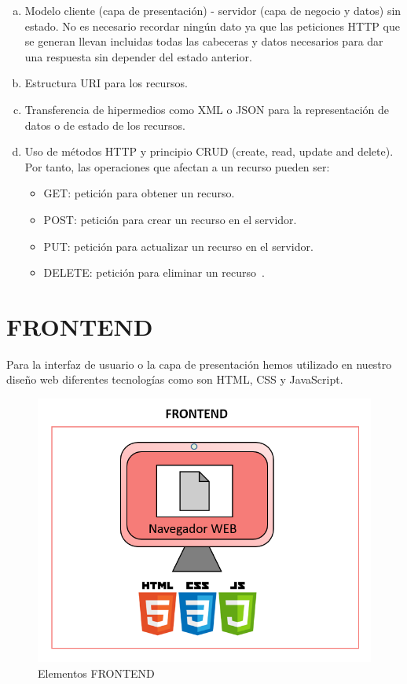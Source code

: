 \documentclass[a4paper, 12pt]{book}
\begin{document}
\begin{enumerate}[a)] %
\item Modelo cliente (capa de presentación) - servidor (capa de negocio y datos) sin estado. No es necesario recordar ningún dato ya que las peticiones HTTP que se generan llevan incluidas todas las cabeceras y datos necesarios para dar una respuesta sin depender del estado anterior.
\item Estructura URI para los recursos.
\item Transferencia de hipermedios como XML o JSON para la representación de datos o de estado de los recursos.
\item Uso de métodos HTTP y principio CRUD (create, read, update and delete). Por tanto, las operaciones que afectan a un recurso pueden ser:
\begin{itemize}
    \item GET: petición para obtener un recurso.
    \item POST: petición para crear un recurso en el servidor.
    \item PUT: petición para actualizar un recurso en el servidor.
    \item DELETE: petición para eliminar un recurso~\cite{rodriguez2008restful}.
\end{itemize}
\end{enumerate}
\section{FRONTEND}
Para la interfaz de usuario o la capa de presentación hemos utilizado en nuestro diseño web diferentes tecnologías como son HTML, CSS y JavaScript.
\begin{figure}[h]
        \centering
        \includegraphics[scale=0.45]{img/frontend.png}
        \caption{Elementos FRONTEND}
        \label{figura:frontend}
\end{figure}
\end{document}
